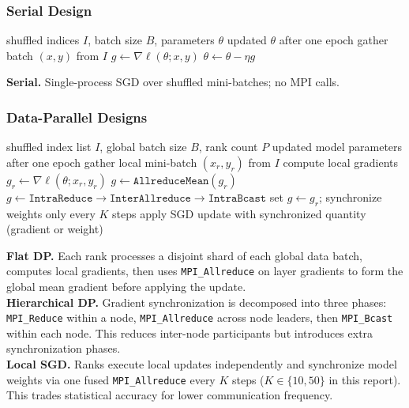 \documentclass[11pt]{article}
\begin{document}
\subsubsection{Serial Design}
\begin{algorithm}[H]
\caption{Serial training epoch}
\label{alg:serial}
\begin{algorithmic}[1]
  \Require shuffled indices $I$, batch size $B$, parameters $\theta$
  \Ensure updated $\theta$ after one epoch
    \State gather batch $(x, y)$ from $I$
    \State $g \leftarrow \nabla \ell(\theta; x, y)$
    \State $\theta \leftarrow \theta - \eta g$
  \EndFor
\end{algorithmic}
\end{algorithm}
\noindent\textbf{Serial.}
Single-process SGD over shuffled mini-batches; no MPI calls.

\subsubsection{Data-Parallel Designs}
\begin{algorithm}[H]
\caption{Data-parallel epoch (flat DP / hierarchical DP / local SGD)}
\label{alg:dp}
\begin{algorithmic}[1]
  \Require shuffled index list $I$, global batch size $B$, rank count $P$
  \Ensure updated model parameters after one epoch
    \State gather local mini-batch $(x_r, y_r)$ from $I$
    \State compute local gradients $g_r \leftarrow \nabla \ell(\theta; x_r, y_r)$
      \State $g \leftarrow \texttt{AllreduceMean}(g_r)$
      \State $g \leftarrow \texttt{IntraReduce} \rightarrow \texttt{InterAllreduce} \rightarrow \texttt{IntraBcast}$
      \State set $g \leftarrow g_r$; synchronize weights only every $K$ steps
    \EndIf
    \State apply SGD update with synchronized quantity (gradient or weight)
  \EndFor
\end{algorithmic}
\end{algorithm}
\noindent\textbf{Flat DP.}
Each rank processes a disjoint shard of each global data batch, computes local
gradients, then uses \texttt{MPI\_Allreduce} on layer gradients to form the
global mean gradient before applying the update. \\
\noindent\textbf{Hierarchical DP.}
Gradient synchronization is decomposed into three phases:
\texttt{MPI\_Reduce} within a node, \texttt{MPI\_Allreduce} across node
leaders, then \texttt{MPI\_Bcast} within each node. This reduces inter-node
participants but introduces extra synchronization phases. \\
\noindent\textbf{Local SGD.}
Ranks execute local updates independently and synchronize model weights via one
fused \texttt{MPI\_Allreduce} every $K$ steps (\(K \in \{10, 50\}\) in this
report). This trades statistical accuracy for lower communication frequency. \\
\end{document}
